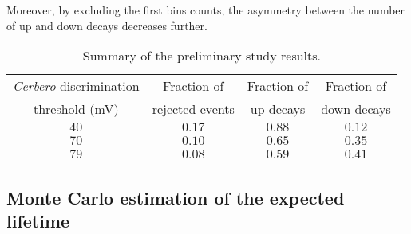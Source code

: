 Moreover, by excluding the first bins counts, the asymmetry between the number of up and down decays decreases further.
\begin{table}[!htp]
	\centering
	\begin{tabular}{cccc}
		\toprule 
		\emph{Cerbero} discrimination & Fraction of &Fraction of&Fraction of\\
		threshold (mV) & rejected events & up decays & down decays\\
		\midrule
		$40$ & $0.17$ & $0.88$ & $0.12$\\
		$70$ & $0.10$ & $0.65$ & $0.35$\\
		$79$ & $0.08$ & $0.59$ & $0.41$\\
		\bottomrule
	\end{tabular}
	\caption{Summary of the preliminary study results.}
\end{table}


\subsection{Monte Carlo estimation of the expected lifetime}\label{sec:lifetimeMC}

